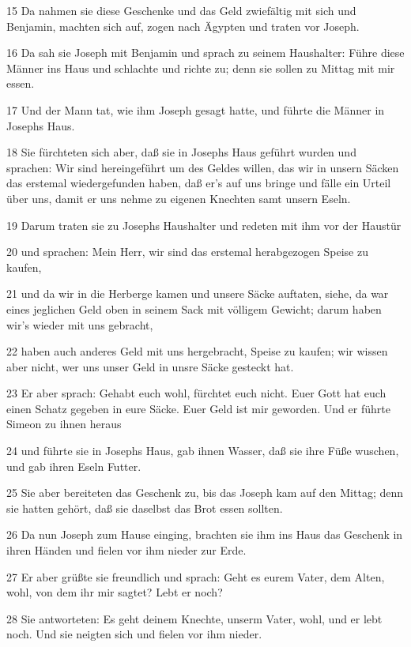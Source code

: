 \par 15 Da nahmen sie diese Geschenke und das Geld zwiefältig mit sich und Benjamin, machten sich auf, zogen nach Ägypten und traten vor Joseph.
\par 16 Da sah sie Joseph mit Benjamin und sprach zu seinem Haushalter: Führe diese Männer ins Haus und schlachte und richte zu; denn sie sollen zu Mittag mit mir essen.
\par 17 Und der Mann tat, wie ihm Joseph gesagt hatte, und führte die Männer in Josephs Haus.
\par 18 Sie fürchteten sich aber, daß sie in Josephs Haus geführt wurden und sprachen: Wir sind hereingeführt um des Geldes willen, das wir in unsern Säcken das erstemal wiedergefunden haben, daß er's auf uns bringe und fälle ein Urteil über uns, damit er uns nehme zu eigenen Knechten samt unsern Eseln.
\par 19 Darum traten sie zu Josephs Haushalter und redeten mit ihm vor der Haustür
\par 20 und sprachen: Mein Herr, wir sind das erstemal herabgezogen Speise zu kaufen,
\par 21 und da wir in die Herberge kamen und unsere Säcke auftaten, siehe, da war eines jeglichen Geld oben in seinem Sack mit völligem Gewicht; darum haben wir's wieder mit uns gebracht,
\par 22 haben auch anderes Geld mit uns hergebracht, Speise zu kaufen; wir wissen aber nicht, wer uns unser Geld in unsre Säcke gesteckt hat.
\par 23 Er aber sprach: Gehabt euch wohl, fürchtet euch nicht. Euer Gott hat euch einen Schatz gegeben in eure Säcke. Euer Geld ist mir geworden. Und er führte Simeon zu ihnen heraus
\par 24 und führte sie in Josephs Haus, gab ihnen Wasser, daß sie ihre Füße wuschen, und gab ihren Eseln Futter.
\par 25 Sie aber bereiteten das Geschenk zu, bis das Joseph kam auf den Mittag; denn sie hatten gehört, daß sie daselbst das Brot essen sollten.
\par 26 Da nun Joseph zum Hause einging, brachten sie ihm ins Haus das Geschenk in ihren Händen und fielen vor ihm nieder zur Erde.
\par 27 Er aber grüßte sie freundlich und sprach: Geht es eurem Vater, dem Alten, wohl, von dem ihr mir sagtet? Lebt er noch?
\par 28 Sie antworteten: Es geht deinem Knechte, unserm Vater, wohl, und er lebt noch. Und sie neigten sich und fielen vor ihm nieder.
